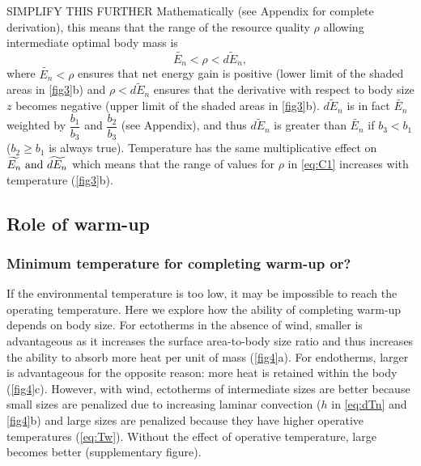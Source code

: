 SIMPLIFY THIS FURTHER
Mathematically (see Appendix for complete derivation), this means that the range of the resource quality $\rho$ allowing intermediate optimal body mass is
\begin{equation}\label{eq:C1}
	\widetilde{E_n} < \rho < \widetilde{dE_n},
\end{equation}
where $\widetilde{E_n} < \rho $ ensures that net energy gain is positive (lower limit of the shaded areas in \cref{fig3}b) and $\rho < \widetilde{dE_n}$ ensures that the derivative with respect to body size $z$ becomes negative (upper limit of the shaded areas in \cref{fig3}b).
$\widetilde{dE_n}$ is in fact $\widetilde{E_n}$ weighted by $\dfrac{b_1}{b_3}$  and $\dfrac{b_2}{b_3}$ (see Appendix), and thus $\widetilde{dE_n}$ is greater than $\widetilde{E_n}$ if  $b_3 < b_1$ ($b_2 \geq b_1$ is always true).
Temperature has the same multiplicative effect on $\widetilde{E_n}\textnormal{ and }\widetilde{dE_n}$ which means that the range of values for $\rho$ in \cref{eq:C1} increases with temperature (\cref{fig3}b).

\subsection*{Role of warm-up}
\subsubsection*{Minimum temperature for completing warm-up or?}
If the environmental temperature is too low, it may be impossible to reach the operating temperature.
Here we explore how the ability of completing warm-up depends on body size.
For ectotherms in the absence of wind, smaller is advantageous as it increases the surface area-to-body size ratio and thus increases the ability to absorb more heat per unit of mass  (\cref{fig4}a).
For endotherms, larger is advantageous for the opposite reason: more heat is retained within the body  (\cref{fig4}c).
However, with wind, ectotherms of intermediate sizes are better because small sizes are penalized due to increasing laminar convection ($h$ in \cref{eq:dTn} and \cref{fig4}b)  and large sizes are penalized because they have higher operative temperatures (\cref{eq:Tw}).
Without the effect of operative temperature, large becomes better (supplementary figure).
